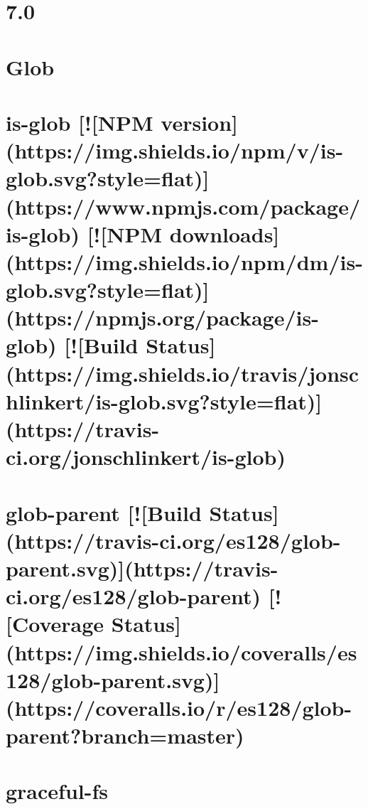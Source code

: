 \documentclass[twoside]{book}
\newcommand{\+}{\discretionary{\mbox{\scriptsize$\hookleftarrow$}}{}{}}
\begin{document}
\chapter{7.0}
\label{md_dsmacc_vis_degree_node_modules_glob_changelog}

\chapter{Glob}
\label{md_dsmacc_vis_degree_node_modules_glob_README}

\chapter{is-\/glob \mbox{[}!\mbox{[}N\+PM version\mbox{]}(https\+://img.shields.\+io/npm/v/is-\/glob.svg?style=flat)\mbox{]}(https\+://www.npmjs.\+com/package/is-\/glob) \mbox{[}!\mbox{[}N\+PM downloads\mbox{]}(https\+://img.shields.\+io/npm/dm/is-\/glob.svg?style=flat)\mbox{]}(https\+://npmjs.org/package/is-\/glob) \mbox{[}!\mbox{[}Build Status\mbox{]}(https\+://img.shields.\+io/travis/jonschlinkert/is-\/glob.svg?style=flat)\mbox{]}(https\+://travis-\/ci.org/jonschlinkert/is-\/glob)}
\label{md_dsmacc_vis_degree_node_modules_glob-parent_node_modules_is-glob_README}

\chapter{glob-\/parent \mbox{[}!\mbox{[}Build Status\mbox{]}(https\+://travis-\/ci.org/es128/glob-\/parent.svg)\mbox{]}(https\+://travis-\/ci.org/es128/glob-\/parent) \mbox{[}!\mbox{[}Coverage Status\mbox{]}(https\+://img.shields.\+io/coveralls/es128/glob-\/parent.svg)\mbox{]}(https\+://coveralls.io/r/es128/glob-\/parent?branch=master)}
\label{md_dsmacc_vis_degree_node_modules_glob-parent_README}

\chapter{graceful-\/fs}
\label{md_dsmacc_vis_degree_node_modules_graceful-fs_README}

\end{document}
